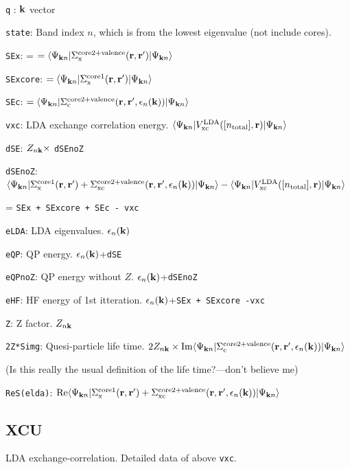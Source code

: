 \documentclass[a4paper,10pt,epsf,fleqn]{article}
\newcommand{\fx}[1]{\subsection{\sf #1\index{\sf #1}}}
\begin{document}
{\ 

{\tt q}  : ${\bf k}$ vector

{\tt state}: Band index $n$, which is from the lowest eigenvalue (not include cores).

{\tt SEx}: = $= \langle\Psi_{{\bf k}n}|\Sigma_{\rm x}^{\rm core2+valence}({\bf r},{\bf r}^{\prime})|\Psi_{{\bf k}n}\rangle$

{\tt SExcore}: $= \langle\Psi_{{\bf k}n}|\Sigma_{\rm x}^{\rm core1}({\bf r},{\bf r}^{\prime})|\Psi_{{\bf k}n}\rangle$

{\tt SEc}: $ = \langle\Psi_{{\bf k}n}|\Sigma_{\rm c}^{\rm core2+valence}({\bf r},{\bf r}^{\prime},\epsilon_n({\bf k}))|\Psi_{{\bf k}n}\rangle$

{\tt vxc}: LDA exchange correlation energy.
$\langle\Psi_{{\bf k}n}|V_{\rm xc}^{\rm LDA}([n_{\rm total}],{\bf r})|\Psi_{{\bf k}n}\rangle$

{\tt dSE}: $Z_{n{\bf k}}\times$ {\tt dSEnoZ}

{\tt dSEnoZ}: $
\langle\Psi_{{\bf k}n}|
\Sigma_{\rm x}^{\rm core1}({\bf r},{\bf r}^{\prime})+
\Sigma_{\rm xc}^{\rm core2+valence}({\bf r},{\bf r}^{\prime},\epsilon_n({\bf k}))
|\Psi_{{\bf k}n}\rangle 
- \langle\Psi_{{\bf k}n}|V_{\rm xc}^{\rm LDA}([n_{\rm total}],{\bf r})|\Psi_{{\bf k}n}\rangle$

\hspace{1cm} = {\tt SEx + SExcore + SEc - vxc}

{\tt eLDA}: LDA eigenvalues. $\epsilon_n({\bf k})$

{\tt eQP}: QP energy.  $\epsilon_n({\bf k})$+{\tt dSE}

{\tt eQPnoZ}: QP energy without $Z$. $\epsilon_n({\bf k})$+{\tt dSEnoZ}

{\tt eHF}: HF energy of 1st itteration. $\epsilon_n({\bf k})$+{\tt SEx + SExcore -vxc}

{\tt Z}: Z factor. $Z_{n{\bf k}}$

{\tt 2Z*Simg}: Quesi-particle life time. 
$2 Z_{n{\bf k}} \times {\rm Im}
\langle\Psi_{{\bf k}n}|
\Sigma_{\rm c}^{\rm core2+valence}({\bf r},{\bf r}^{\prime},\epsilon_n({\bf k}))
|\Psi_{{\bf k}n}\rangle$ 

(Is this really the usual definition of the life time?---don't believe me)

{\tt ReS(elda)}:
${\rm Re}
\langle\Psi_{{\bf k}n}|
\Sigma_{\rm x}^{\rm core1}({\bf r},{\bf r}^{\prime})+
\Sigma_{\rm xc}^{\rm core2+valence}({\bf r},{\bf r}^{\prime},\epsilon_n({\bf k}))
|\Psi_{{\bf k}n}\rangle$ 


\fx{XCU}
LDA exchange-correlation. 
Detailed data of above {\tt vxc}.

}
\end{document}
